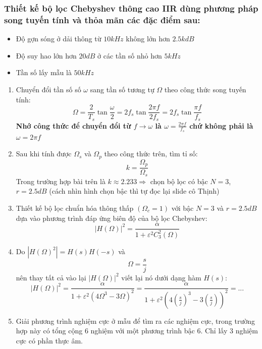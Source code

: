 \documentclass{article}
\begin{document}
\subsubsection{Thiết kế bộ lọc Chebyshev thông cao IIR dùng phương pháp song tuyến tính và thỏa mãn các đặc điểm sau:
}
\begin{itemize}
  \item Độ gợn sóng ở dải thông từ $10kHz$ không lớn hơn $2.5kdB$
  \item Độ suy hao lớn hơn $20dB$ ở các tần số nhỏ hơn $5kHz$
  \item Tần số lấy mẫu là $50kHz$
\end{itemize}
\begin{enumerate}
  \item Chuyển đổi tần số số $\omega$ sang tần số tương tự $\Omega$ theo công thức song tuyến tính:
  \begin{equation*}
    \Omega = \frac{2}{T_{s}}\tan{\frac{\omega}{2}}=2f_{s}\tan{\frac{2\pi f}{2f_{s}}}=2f_{s}\tan{\frac{\pi f}{f_{s}}}
  \end{equation*}
 \textbf{Nhớ công thức để chuyển đổi từ $f\to\omega$ là $\omega=\frac{2\pi f}{f_{s}}$ chứ không phải là $\omega = 2\pi f$}
  \item Sau khi tính được $\Omega_{s}$ và $\Omega_{p}$ theo công thức trên, tìm tỉ số:
  \begin{equation*}
    k= \frac{\Omega_{p}}{\Omega_{s}}
  \end{equation*}
Trong trường hợp bài trên là $k\approx 2.233 \Rightarrow$ chọn bộ lọc có bậc $N=3$, $r=2.5dB$ (cách nhìn hình chọn bậc thì tự đọc lại slide cô Thịnh)
  \item Thiết kế bộ lọc chuẩn hóa thông thấp $(\Omega_{c}=1)$ với bậc $N=3$ và $r=2.5dB$ dựa vào phương trình đáp ứng biên độ của bộ lọc Chebyshev:
  \begin{equation*}
    |H(\Omega)|^2=\frac{\alpha}{1+\varepsilon^2C_{3}^2(\Omega)}
  \end{equation*}
  \item Do $|H(\Omega)^2|=H(s)H(-s)$ và $$\Omega=\frac{s}{j}$$ nên thay tất cả vào lại $|H(\Omega)|^2$ viết lại nó dưới dạng hàm $H(s)$:
  \begin{equation*}
    |H(\Omega)|^2=\frac{\alpha}{1+\varepsilon^2(4\Omega^3-3\Omega)^2}=\frac{\alpha}{1+\varepsilon^2\left(4(\frac{s}{j})^3-3\left(\frac{s}{j}\right)\right)^2}=...
  \end{equation*}
  \item Giải phương trình nghiệm cực ở mẫu để tìm ra các nghiệm cực, trong trường hợp này có tổng cộng $6$ nghiệm với một phương trình bậc $6$. Chỉ lấy $3$ nghiệm cực có phần thực âm.

\end{enumerate}
\end{document}
